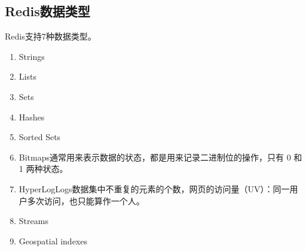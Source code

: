 \documentclass[../../../interview-questions.tex]{subfiles}
\begin{document}
\subsection{Redis数据类型}

Redis支持7种数据类型。

\begin{enumerate}
    \item {Strings}
    \item {Lists}
    \item {Sets}
    \item {Hashes}
    \item {Sorted Sets}
    \item {Bitmaps}通常用来表示数据的状态，都是用来记录二进制位的操作，只有 0 和 1 两种状态。
    \item {HyperLogLogs}数据集中不重复的元素的个数，网页的访问量（UV）：同一用户多次访问，也只能算作一个人。
    \item {Streams}
    \item {Geospatial indexes}
\end{enumerate}
\end{document}
